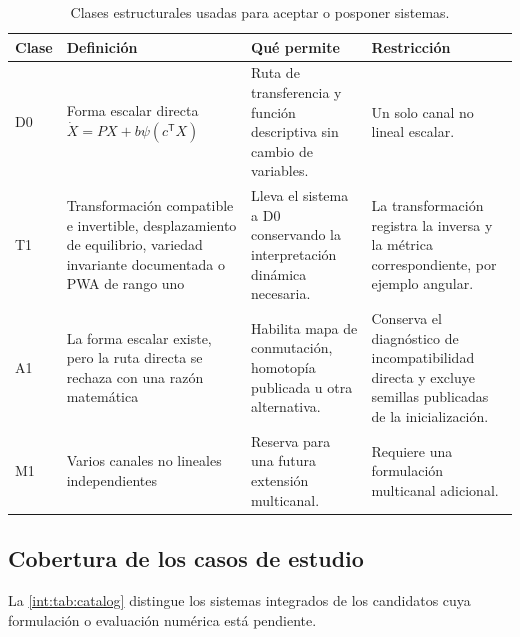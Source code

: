 \begin{table}[H]
\centering
\caption{Clases estructurales usadas para aceptar o posponer sistemas.}
\small
\begin{tabularx}{\textwidth}{@{}C{1.1cm}p{0.24\textwidth}Yp{0.25\textwidth}@{}}
\toprule
Clase & Definición & Qué permite & Restricción \\
\midrule
D0 & Forma escalar directa \(\dot X=PX+b\psi(c^{\mathsf T}X)\) &
Ruta de transferencia y función descriptiva sin cambio de variables. &
Un solo canal no lineal escalar. \\
T1 & Transformación compatible e invertible, desplazamiento de equilibrio,
variedad invariante documentada o PWA de rango uno &
Lleva el sistema a D0 conservando la interpretación dinámica necesaria. &
La transformación registra la inversa y la métrica correspondiente, por ejemplo angular. \\
A1 & La forma escalar existe, pero la ruta directa se rechaza con una razón
matemática &
Habilita mapa de conmutación, homotopía publicada u otra alternativa. &
Conserva el diagnóstico de incompatibilidad directa y excluye semillas
publicadas de la inicialización. \\
M1 & Varios canales no lineales independientes &
Reserva para una futura extensión multicanal. &
Requiere una formulación multicanal adicional. \\
\bottomrule
\end{tabularx}
\end{table}

\subsection{Cobertura de los casos de estudio}

La \cref{int:tab:catalog} distingue los sistemas integrados de los candidatos
cuya formulación o evaluación numérica está pendiente.

